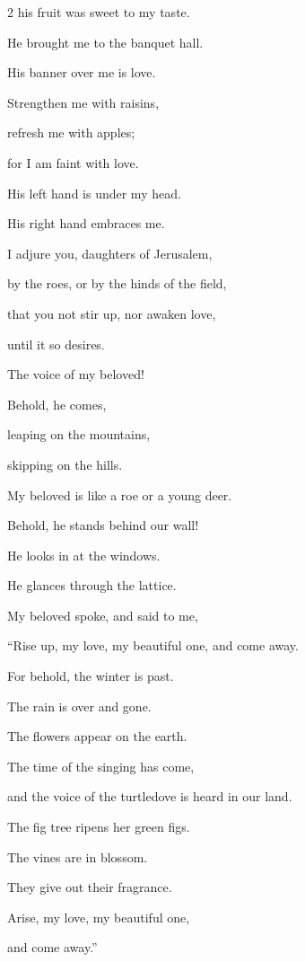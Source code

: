 \begin{multicols}{2}
his fruit was sweet to my taste.

\myverse{}He brought me to the banquet hall.

His banner over me is love.

\myverse{}Strengthen me with raisins,

refresh me with apples;

for I am faint with love.

\myverse{}His left hand is under my head.

His right hand embraces me.

\myverse{}I adjure you, daughters of Jerusalem,

by the roes, or by the hinds of the field,

that you not stir up, nor awaken love,

until it so desires.

\vspace{\baselineskip}

 \myverse{}The voice of my beloved!

Behold, he comes,

leaping on the mountains,

skipping on the hills.

\myverse{}My beloved is like a roe or a young deer.

Behold, he stands behind our wall!

He looks in at the windows.

He glances through the lattice.

\vspace{\baselineskip} 

\myverse{}My beloved spoke, and said to me,

“Rise up, my love, my beautiful one, and come away.

\myverse{}For behold, the winter is past.

The rain is over and gone.

\myverse{}The flowers appear on the earth.

The time of the singing has come,

and the voice of the turtledove is heard in our land.

\myverse{}The fig tree ripens her green figs.

The vines are in blossom.

They give out their fragrance.

Arise, my love, my beautiful one,

and come away.”



\end{multicols}
